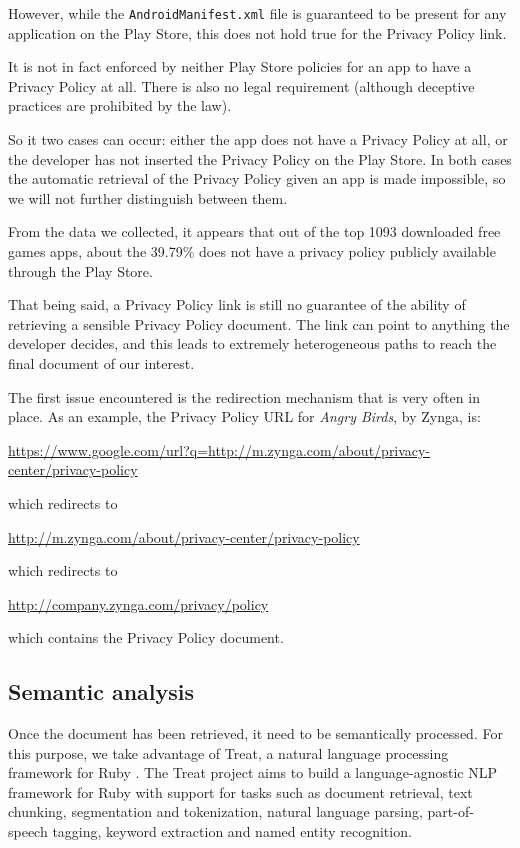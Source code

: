 \documentclass[twoside,letterpaper]{soups}
\theoremstyle{definition}
\begin{document}
However, while the \texttt{AndroidManifest.xml} file is guaranteed to be present for any application on the Play Store, this does not hold true for the Privacy Policy link. 

It is not in fact enforced by neither Play Store policies for an app to have a Privacy Policy at all. There is also no legal requirement (although deceptive practices are prohibited by the law).

So it two cases can occur: either the app does not have a Privacy Policy at all, or the developer has not inserted the Privacy Policy on the Play Store. In both cases the automatic retrieval of the Privacy Policy given an app is made impossible, so we will not further distinguish between them.

From the data we collected, it appears that out of the top 1093 downloaded free games apps, about the 39.79\% does not have a privacy policy publicly available through the Play Store.


That being said, a Privacy Policy link is still no guarantee of the ability of retrieving a sensible Privacy Policy document. The link can point to anything the developer decides, and this leads to extremely heterogeneous paths to reach the final document of our interest.

The first issue encountered is the redirection mechanism that is very often in place. As an example, the Privacy Policy URL for \emph{Angry Birds}, by Zynga, is:

\url{https://www.google.com/url?q=http://m.zynga.com/about/privacy-center/privacy-policy}

which redirects to

\url{http://m.zynga.com/about/privacy-center/privacy-policy}

which redirects to

\url{http://company.zynga.com/privacy/policy}

which contains the Privacy Policy document.


\subsection{Semantic analysis}
Once the document has been retrieved, it need to be semantically processed. For this purpose, we take advantage of Treat, a natural language processing framework for Ruby \cite{treat}. The Treat project aims to build a language-agnostic NLP framework for Ruby with support for tasks such as document retrieval, text chunking, segmentation and tokenization, natural language parsing, part-of-speech tagging, keyword extraction and named entity recognition.
\end{document}

